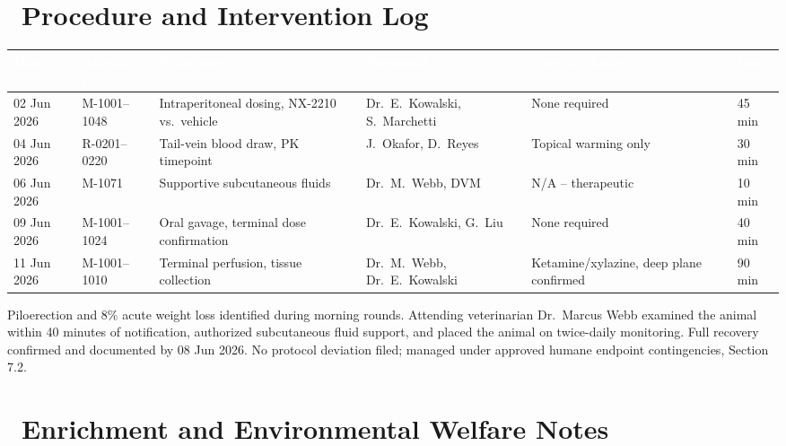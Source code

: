 \documentclass[11pt]{scrreprt}
\begin{document}
\section*{\faLock\ Procedure and Intervention Log}

\begin{footnotesize}
\begin{tabularx}{\textwidth}{@{}p{1.5cm}p{1.5cm}X p{2.0cm}p{2.5cm}p{1.3cm}@{}}
\toprule
\rowcolor{vivteal}
\textcolor{white}{\textbf{Date}} & \textcolor{white}{\textbf{Animal ID}} &
\textcolor{white}{\textbf{Procedure}} & \textcolor{white}{\textbf{Personnel}} &
\textcolor{white}{\textbf{Anesth./Analg.}} & \textcolor{white}{\textbf{Dur.}} \\
\midrule
02 Jun 2026 & M-1001--1048 & Intraperitoneal dosing, NX-2210 vs.\ vehicle & Dr.\ E.\ Kowalski, S.\ Marchetti & None required & 45 min \\
04 Jun 2026 & R-0201--0220 & Tail-vein blood draw, PK timepoint & J.\ Okafor, D.\ Reyes & Topical warming only & 30 min \\
06 Jun 2026 & M-1071 & Supportive subcutaneous fluids & Dr.\ M.\ Webb, DVM & N/A -- therapeutic & 10 min \\
09 Jun 2026 & M-1001--1024 & Oral gavage, terminal dose confirmation & Dr.\ E.\ Kowalski, G.\ Liu & None required & 40 min \\
11 Jun 2026 & M-1001--1010 & Terminal perfusion, tissue collection & Dr.\ M.\ Webb, Dr.\ E.\ Kowalski & Ketamine/xylazine, deep plane confirmed & 90 min \\
\bottomrule
\end{tabularx}
\end{footnotesize}

\vspace{0.3cm}

\begin{noteslip}[title={\faPhone\ Adverse Event Note -- 05 Jun 2026, Animal M-1071}]
Piloerection and 8\% acute weight loss identified during morning rounds. Attending
veterinarian Dr.\ Marcus Webb examined the animal within 40 minutes of notification,
authorized subcutaneous fluid support, and placed the animal on twice-daily monitoring.
Full recovery confirmed and documented by 08 Jun 2026. No protocol deviation filed;
managed under approved humane endpoint contingencies, Section 7.2.
\end{noteslip}

\section*{\faFile\ Enrichment and Environmental Welfare Notes}
\end{document}
